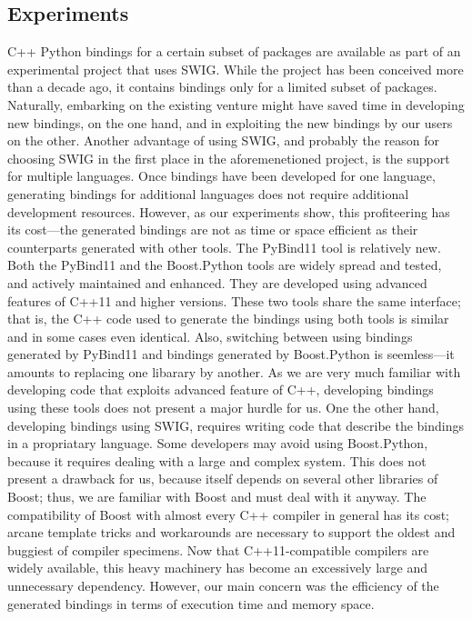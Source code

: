 \subsection{Experiments}
\label{ssec:comp:exp}
C++ Python bindings for a certain subset of \cgal{} packages are
available as part of an experimental project that uses SWIG. While the
project has been conceived more than a decade ago, it contains
bindings only for a limited subset of \cgal{} packages. Naturally,
embarking on the existing venture might have saved time in developing
new bindings, on the one hand, and in exploiting the new bindings by
our users on the other. Another advantage of using SWIG, and probably
the reason for choosing SWIG in the first place in the aforemenetioned
project, is the support for multiple languages. Once bindings have
been developed for one language, generating bindings for additional
languages does not require additional development resources. However,
as our experiments show, this profiteering has its cost---the
generated bindings are not as time or space efficient as their
counterparts generated with other tools. The PyBind11 tool is
relatively new. Both the PyBind11 and the Boost.Python tools are
widely spread and tested, and actively maintained and enhanced. They
are developed using advanced features of C++11 and higher
versions. These two tools share the same interface; that is, the C++
code used to generate the bindings using both tools is similar and in
some cases even identical. Also, switching between using bindings
generated by PyBind11 and bindings generated by Boost.Python is
seemless---it amounts to replacing one libarary by another. As we are
very much familiar with developing code that exploits advanced feature
of C++, developing bindings using these tools does not present a major
hurdle for us. One the other hand, developing bindings using SWIG,
requires writing code that describe the bindings in a propriatary
language.  Some developers may avoid using Boost.Python, because it
requires dealing with a large and complex system. This does not
present a drawback for us, because \cgal{} itself depends on several
other libraries of Boost; thus, we are familiar with Boost and must
deal with it anyway.  The compatibility of Boost with almost every C++
compiler in general has its cost; arcane template tricks and
workarounds are necessary to support the oldest and buggiest of
compiler specimens.  Now that C++11-compatible compilers are widely
available, this heavy machinery has become an excessively large and
unnecessary dependency. However, our main concern was the efficiency
of the generated bindings in terms of execution time and memory space.

